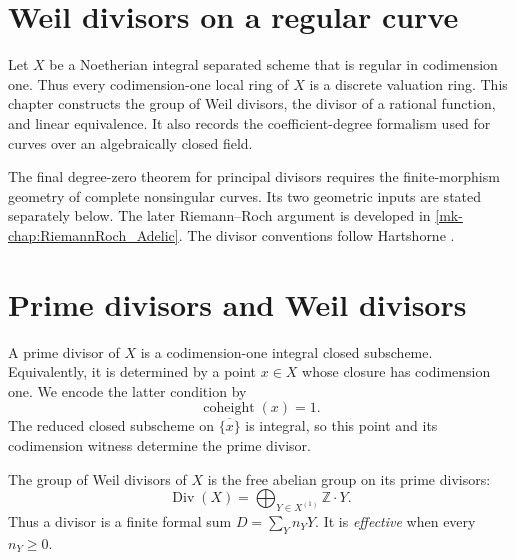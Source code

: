 \section{Weil divisors on a regular curve}
\label{mk-chap:RiemannRoch_WeilDivisor}

Let \(X\) be a Noetherian integral separated scheme that is regular in
codimension one.  Thus every codimension-one local ring of \(X\) is a
discrete valuation ring.  This chapter constructs the group of Weil
divisors, the divisor of a rational function, and linear equivalence.  It
also records the coefficient-degree formalism used for curves over an
algebraically closed field.

The final degree-zero theorem for principal divisors requires the
finite-morphism geometry of complete nonsingular curves.  Its two geometric
inputs are stated separately below.  The later Riemann--Roch argument is developed in
\ref{mk-chap:RiemannRoch_Adelic}.
The divisor conventions follow Hartshorne \cite{hartshorne-ag}.

\section{Prime divisors and Weil divisors}

\begin{definition}
  \label{mk-def:prime_divisor}
  \leanok

  A prime divisor of \(X\) is a codimension-one integral closed subscheme.
  Equivalently, it is determined by a point \(x\in X\) whose closure has
  codimension one.  We encode the latter condition by
  \[
    \operatorname{coheight}(x)=1.
  \]
  The reduced closed subscheme on \(\overline{\{x\}}\) is integral, so this
  point and its codimension witness determine the prime divisor.
\end{definition}

\begin{definition}
  \label{mk-def:codim1_cycles}
  \leanok


  The group of Weil divisors of \(X\) is the free abelian group on its prime
  divisors:
  \[
    \operatorname{Div}(X)
      =\bigoplus_{Y\in X^{(1)}}\mathbb Z\cdot Y.
  \]
  Thus a divisor is a finite formal sum \(D=\sum_Y n_Y Y\).  It is
  \emph{effective} when every \(n_Y\geq 0\).
\end{definition}

